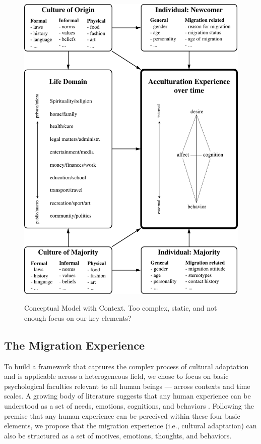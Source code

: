 \documentclass[man, 12pt, a4paper]{apa7}
\begin{document}
\begin{figure}[h]
\centering
\caption{Conceptual Model with Context. Too complex, static, and not enough focus on our key elements?}
\includegraphics[width=\textwidth]{Figures/ConceptualFrameworkStatic.pdf}
\label{fig:ModelContext}
\end{figure}

\subsection{The Migration Experience}
To build a framework that captures the complex process of cultural adaptation and is applicable across a heterogeneous field, we chose to focus on basic psychological faculties relevant to all human beings --- across contexts and time scales. A growing body of literature suggests that any human experience can be understood as a set of needs, emotions, cognitions, and behaviors \citep[sometimes referred to as the ABCs or ABCDs of psychology: affect, behavior, cognition, desire; e.g.,][]{Cottam2010, Hogg2005, Jhangiani2014}. Following the premise that any human experience can be perceived within these four basic elements, we propose that the migration experience (i.e., cultural adaptation) can also be structured as a set of motives, emotions, thoughts, and behaviors. 
\end{document}
